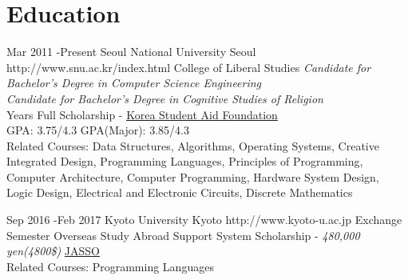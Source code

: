 \documentclass[10pt]{article} %
\begin{document}

\section{Education}

\job
{Mar 2011 -}{Present}
{Seoul National University}
{Seoul}
{http://www.snu.ac.kr/index.html}
{College of Liberal Studies}
{
\textit{Candidate for Bachelor's Degree in Computer Science Engineering}\\
\if{}
\textit{Candidate for Bachelor's Degree in Cognitive Studies of Religion}\\
 Years Full Scholarship - \href{http://eng.kosaf.go.kr/jsp/main.jsp}{Korea Student Aid Foundation}\\
GPA: 3.75/4.3 \hspace{10mm} GPA(Major): 3.85/4.3\\
Related Courses: Data Structures, Algorithms, Operating Systems, Creative Integrated Design, Programming Languages, Principles of Programming, Computer Architecture, Computer Programming, Hardware System Design, Logic Design, Electrical and Electronic Circuits, Discrete Mathematics
}


\if{}
\job
{Sep 2016 -}{Feb 2017}
{Kyoto University}
{Kyoto}
{http://www.kyoto-u.ac.jp}
{Exchange Semester}
{
Overseas Study Abroad Support System Scholarship - \textit{480,000 yen(4800\$)} \href{http://www.jasso.go.jp/ryugaku/tantosha/study_a/short_term_h/index.html}{JASSO}\\
Related Courses: Programming Languages
}
\fi

\end{document}
